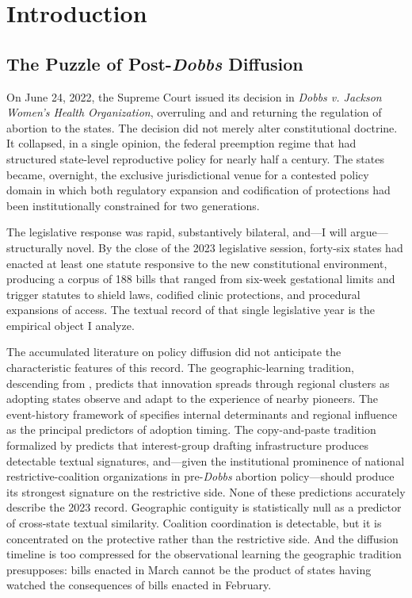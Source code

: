 \chapter{Introduction}
\label{ch:introduction}

\section{The Puzzle of Post-\textit{Dobbs} Diffusion}

On June 24, 2022, the Supreme Court issued its decision in \textit{Dobbs v. Jackson Women's Health Organization}, overruling \textcite{RoeWade1971} and \textcite{PlannedParenthoodSoutheastern1992} and returning the regulation of abortion to the states. The decision did not merely alter constitutional doctrine. It collapsed, in a single opinion, the federal preemption regime that had structured state-level reproductive policy for nearly half a century. The states became, overnight, the exclusive jurisdictional venue for a contested policy domain in which both regulatory expansion and codification of protections had been institutionally constrained for two generations.

The legislative response was rapid, substantively bilateral, and---I will argue---structurally novel. By the close of the 2023 legislative session, forty-six states had enacted at least one statute responsive to the new constitutional environment, producing a corpus of 188 bills that ranged from six-week gestational limits and trigger statutes to shield laws, codified clinic protections, and procedural expansions of access. The textual record of that single legislative year is the empirical object I analyze.

The accumulated literature on policy diffusion did not anticipate the characteristic features of this record. The geographic-learning tradition, descending from \textcite{walkerDiffusionInnovationsAmerican1969}, predicts that innovation spreads through regional clusters as adopting states observe and adapt to the experience of nearby pioneers. The event-history framework of \textcite{berryStateLotteryAdoptions1990} specifies internal determinants and regional influence as the principal predictors of adoption timing. The copy-and-paste tradition formalized by \textcite{jansaCopyPasteLawmaking2019} predicts that interest-group drafting infrastructure produces detectable textual signatures, and---given the institutional prominence of national restrictive-coalition organizations in pre-\textit{Dobbs} abortion policy---should produce its strongest signature on the restrictive side. None of these predictions accurately describe the 2023 record. Geographic contiguity is statistically null as a predictor of cross-state textual similarity. Coalition coordination is detectable, but it is concentrated on the protective rather than the restrictive side. And the diffusion timeline is too compressed for the observational learning the geographic tradition presupposes: bills enacted in March cannot be the product of states having watched the consequences of bills enacted in February.

